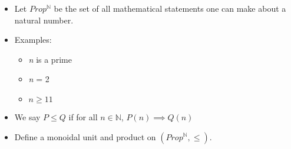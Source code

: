 \begin{itemize}
    \item Let $Prop^\mathbb{N}$ be the set of all mathematical statements one can make about a natural number.
    \item Examples:
          \begin{itemize}
            \item \emph{n} is a prime
            \item \emph{n} = 2
            \item $n \geq 11$
          \end{itemize}
    \item We say $P \leq Q$ if for all $n \in \mathbb{N}$, $P(n) \implies Q(n)$
    \item Define a monoidal unit and product on $(Prop^\mathbb{N}, \leq)$.
  \end{itemize}